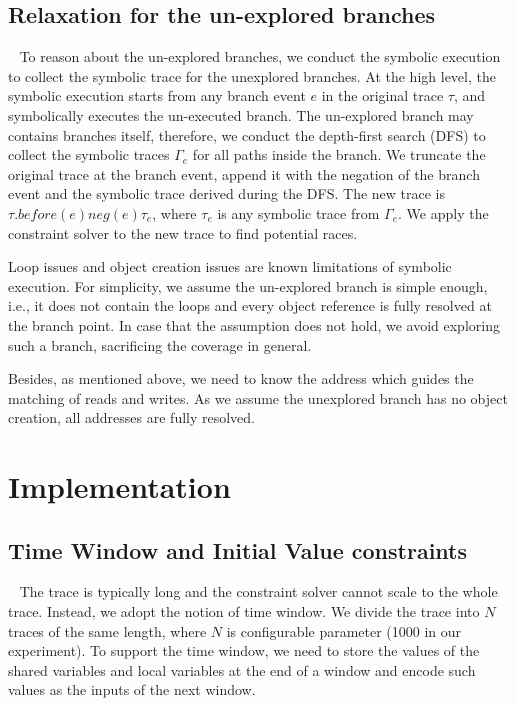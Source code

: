  

 




 
\subsection{Relaxation for the un-explored branches}~\label{sec:unexplored}
To reason about the un-explored branches, we conduct the symbolic execution to collect the symbolic trace for the unexplored branches. 
At the high level, the symbolic execution starts from any branch event $e$ in the original trace $\tau$, and symbolically executes the un-executed branch. 
The un-explored branch may contains branches itself, therefore, we conduct the depth-first search (DFS) to collect the symbolic traces $\Gamma_e$ for all paths inside the branch.  We truncate the original trace at the branch event,  append it with the negation of the branch event and the symbolic trace derived during the DFS.  The new trace is $\tau.before(e) neg(e) \tau_e$, where $\tau_e$ is any symbolic trace from $\Gamma_e$. We apply the constraint solver to the new trace to find potential races.

Loop issues and object creation issues are known limitations of symbolic execution. For simplicity, we assume the un-explored branch is simple enough, i.e., it does not contain the loops and every object reference is fully resolved at the branch point. In case that the assumption does not hold, we avoid exploring such a branch, sacrificing the coverage in general. 

Besides, as mentioned above, we need to know the address which guides the matching of reads and writes. As we assume the unexplored branch has no object creation, all addresses are fully resolved.




\section{Implementation}\label{sec:impl}


\subsection{Time Window and Initial Value constraints}~\label{sec:timewindow}
The trace is typically long and the constraint solver cannot scale to the whole trace. Instead, we adopt the notion of time window. 
We divide the trace into $N$ traces of the same length, where $N$ is configurable parameter (1000 in our experiment). To support the time window, we need to store the values of the shared variables and local variables at the end of a window and encode such values as the inputs of the next window. 

